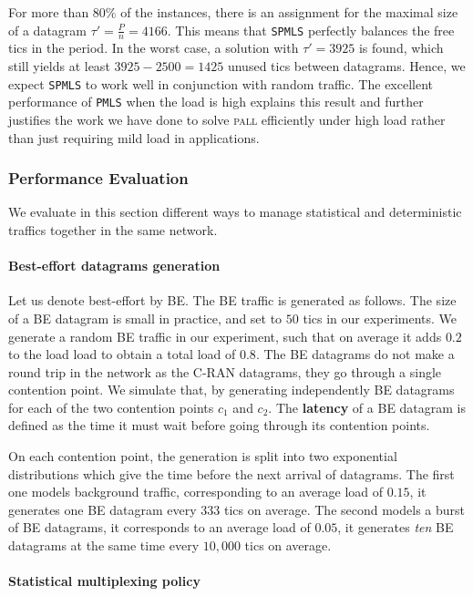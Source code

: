 \documentclass[a4paper,10pt]{journal}
\newcommand\PMLS{\texttt{PMLS}\xspace}
\newcommand\SPMLS{\texttt{SPMLS}\xspace}
\newcommand\pall{\textsc{pall}\xspace}
\begin{document}
	For more than $80\%$ of the instances, there is an assignment for the maximal size of a datagram $\tau' = \frac{P}{n} = 4166$. This means that \SPMLS perfectly balances the free tics in the period. In the worst case, a solution with $\tau' = 3925$ is found, which still yields at least $3925 - 2500 = 1425$ unused tics between datagrams. Hence, we expect \SPMLS to work well in conjunction with random traffic. 	The excellent performance of \PMLS when the load is high explains this result and further justifies the work we have done to solve \pall efficiently under high load rather than just requiring mild load in applications. 


    \subsubsection{Performance Evaluation}
    
    We evaluate in this section different ways to manage statistical and deterministic traffics together in the same network.
 
    \paragraph{Best-effort datagrams generation}
   Let us denote best-effort by BE. The BE traffic is generated as follows. The size of a BE datagram is small in practice, and set to $50$ tics in our experiments. We generate a random BE traffic in our experiment, such that on average it adds $0.2$ to the load load to obtain a total load of $0.8$. The BE datagrams do not make a round trip in the network as the C-RAN datagrams, they go through a single contention point. 
    We simulate that, by generating independently BE datagrams for each of the two contention points $c_1$ and $c_2$. The \textbf{latency} of a BE datagram is defined as the time it must wait before going through its contention points.

    On each contention point, the generation is split into two exponential distributions which give the time before the next arrival of datagrams. The first one models background traffic, corresponding to an average load of $0.15$,  it generates one BE datagram every $333$ tics on average. The second models a burst of BE datagrams, it corresponds to an average load of $0.05$, it generates \emph{ten} BE datagrams at the same time every $10,000$ tics on average. 
    
   	\paragraph{Statistical multiplexing policy}
\end{document}
